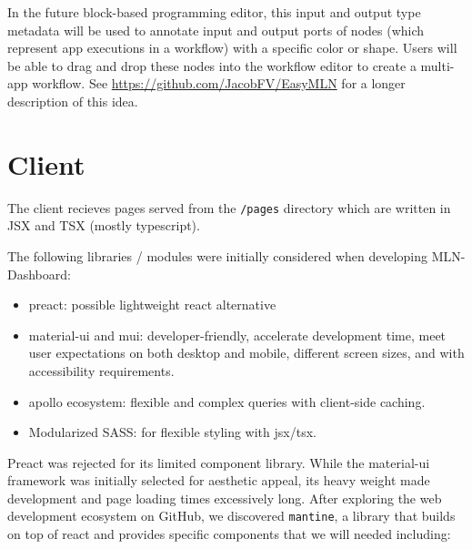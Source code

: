In the future block-based programming editor, this input and output type
metadata will be used to annotate input and output ports of nodes (which
represent app executions in a workflow) with a specific color or shape.
Users will be able to drag and drop these nodes into the workflow editor
to create a multi-app workflow. See
\url{https://github.com/JacobFV/EasyMLN} for a longer description of
this idea.

\hypertarget{client}{%
\section{Client}\label{client}}

The client recieves pages served from the \texttt{/pages} directory
which are written in JSX and TSX (mostly typescript).

The following libraries / modules were initially considered when
developing MLN-Dashboard:

\begin{itemize}
\tightlist
\item
  preact: possible lightweight react alternative
\item
  material-ui and mui: developer-friendly, accelerate development time,
  meet user expectations on both desktop and mobile, different screen
  sizes, and with accessibility requirements.
\item
  apollo ecosystem: flexible and complex queries with client-side
  caching.
\item
  Modularized SASS: for flexible styling with jsx/tsx.
\end{itemize}

Preact was rejected for its limited component library. While the
material-ui framework was initially selected for aesthetic appeal, its
heavy weight made development and page loading times excessively long.
After exploring the web development ecosystem on GitHub, we discovered
\texttt{mantine}, a library that builds on top of react and provides
specific components that we will needed including:

